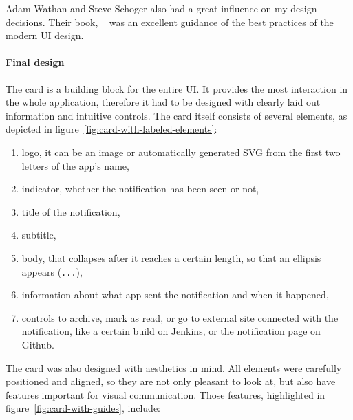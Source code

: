 Adam Wathan and Steve Schoger
also had a great influence
on my design decisions.
Their book,
~\cite{wathan_refactoring_2018}
was an excellent guidance of the best practices
of the modern \ac{UI} design.

\paragraph*{Final design}\label{sec:final-design}

The card is a building block for the entire \ac{UI}.
It provides the most interaction in the whole application,
therefore it had to be designed with clearly laid out information
and intuitive controls.
The card itself consists of several elements,
as depicted in figure~\ref{fig:card-with-labeled-elements}:

\begin{enumerate}
      \item
            logo,
            it can be an image
            or automatically generated \ac{SVG}
            from the first two letters of the app's name,
      \item
            indicator,
            whether the notification has been seen or not,
      \item
            title of the notification,
      \item
            subtitle,
      \item
            body,
            that collapses after it reaches a certain length,
            so that an ellipsis appears (\texttt{...}),
      \item
            information about what app sent the notification and when it happened,
      \item
            controls to archive,
            mark as read,
            or go to external site connected with the notification,
            like a certain build on Jenkins,
            or the notification page on Github.
\end{enumerate}

The card was also designed with aesthetics in mind.
All elements were carefully positioned and aligned,
so they are not only pleasant to look at,
but also have features important for visual communication.
Those features, highlighted in figure~\ref{fig:card-with-guides}, include:

